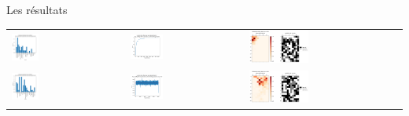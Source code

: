 \documentclass{beamer}
\begin{document}
\begin{frame}{Les résultats}
\begin{tabular}{lll}
\includegraphics[width=0.25\textwidth]{15_fig_freq.png} & \includegraphics[width=0.30\textwidth]{15_fig_evol_fitness.png} &\includegraphics[width=0.40\textwidth]{15_fig_cases.png} \\
\includegraphics[width=0.25\textwidth]{nv_scoring_freq.png} & \includegraphics[width=0.30\textwidth]{nv_scoring_evol_fitness.png} & \includegraphics[width=0.40\textwidth]{nv_scoring_cases.png} \\
\end{tabular}
\end{frame}
\end{document}

